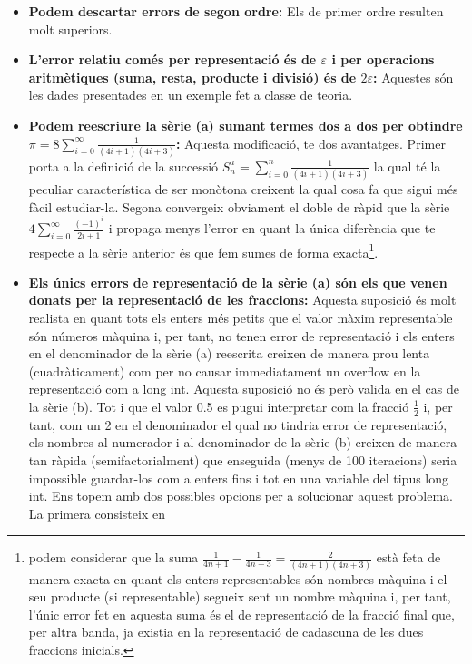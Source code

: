 \documentclass[a4paper,10pt]{article}
\renewcommand{\*}{\cdot}
\renewcommand{\epsilon}{\varepsilon}
\begin{document}
\begin{itemize}
 \item \textbf{Podem descartar errors de segon ordre:} Els de primer ordre resulten molt superiors.
 \item \textbf{L'error relatiu comés per representació és de $\epsilon$  i per operacions aritmètiques (suma, resta, producte i divisió) és de $2\epsilon$:} Aquestes són les
 dades presentades en un exemple fet a classe de teoria.
 \item \textbf{Podem reescriure la sèrie (a) sumant termes dos a dos per obtindre $\pi=8\sum\limits_{i=0}^{\infty}\frac{1}{(4i+1)(4i+3)}$:} Aquesta modificació, te dos
 avantatges. Primer porta a la definició de la successió $S_n^a=\sum\limits_{i=0}^n\frac{1}{(4i+1)(4i+3)}$ la qual té la peculiar característica de ser monòtona creixent la 
 qual cosa fa que sigui més fàcil estudiar-la. Segona convergeix obviament el doble de ràpid que la sèrie $4\sum_{i=0}^{\infty}\frac{(-1)^i}{2i+1}$ i propaga menys l'error
 en quant la única diferència que te respecte a la sèrie anterior és que fem sumes de forma exacta\footnote{podem considerar que la suma 
 $\frac{1}{4n+1}-\frac{1}{4n+3}=\frac{2}{(4n+1)(4n+3)}$ està feta de manera exacta en quant els enters representables són nombres màquina i el seu producte 
 (si representable) segueix sent un nombre màquina i, per tant, l'únic error fet en aquesta suma és el de representació de la fracció final que, per altra banda, ja existia
 en la representació de cadascuna de les dues fraccions inicials.}.
 \item \textbf{Els únics errors de representació de la sèrie (a) són els que venen donats per la representació de les fraccions:} Aquesta suposició és molt realista en quant
 tots els enters més petits que el valor màxim representable són números màquina i, per tant, no tenen error de representació i els enters en el denominador de la sèrie (a)
 reescrita creixen de manera prou lenta (cuadràticament) com per no causar immediatament un overflow en la representació com a long int. Aquesta suposició no és però valida en el cas de
 la sèrie (b). Tot i que el valor 0.5 es pugui interpretar com la fracció $\frac{1}{2}$ i,  per tant, com un 2 en el denominador el qual no tindria error de representació,
 els nombres al numerador i al denominador de la sèrie (b) creixen de manera tan ràpida (semifactorialment) que enseguida (menys de 100 iteracions) seria impossible
 guardar-los com a enters fins i tot en una variable del tipus long int. Ens topem amb dos possibles opcions per a solucionar aquest problema. La primera consisteix en 

\end{itemize}
\end{document}
